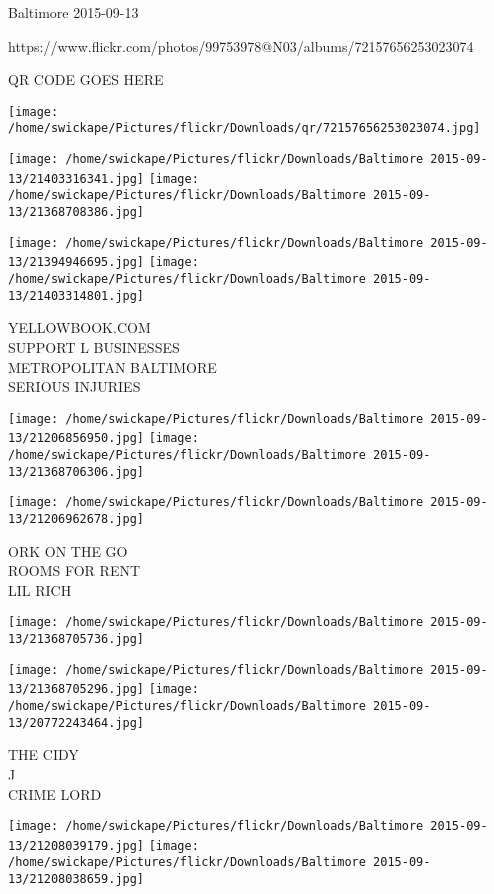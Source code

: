 \documentclass[10pt,letterpaper]{article}
\begin{document}
Baltimore 2015-09-13

https://www.flickr.com/photos/99753978@N03/albums/72157656253023074

QR CODE GOES HERE

\texttt{[image: /home/swickape/Pictures/flickr/Downloads/qr/72157656253023074.jpg]}
\pagebreak

\texttt{[image: /home/swickape/Pictures/flickr/Downloads/Baltimore 2015-09-13/21403316341.jpg]}
\texttt{[image: /home/swickape/Pictures/flickr/Downloads/Baltimore 2015-09-13/21368708386.jpg]}

\texttt{[image: /home/swickape/Pictures/flickr/Downloads/Baltimore 2015-09-13/21394946695.jpg]}
\texttt{[image: /home/swickape/Pictures/flickr/Downloads/Baltimore 2015-09-13/21403314801.jpg]}

YELLOWBOOK.COM\\
SUPPORT L BUSINESSES\\
METROPOLITAN BALTIMORE\\
SERIOUS INJURIES\\
\pagebreak

\texttt{[image: /home/swickape/Pictures/flickr/Downloads/Baltimore 2015-09-13/21206856950.jpg]}
\texttt{[image: /home/swickape/Pictures/flickr/Downloads/Baltimore 2015-09-13/21368706306.jpg]}

\vspace{0.25in}
\texttt{[image: /home/swickape/Pictures/flickr/Downloads/Baltimore 2015-09-13/21206962678.jpg]}

ORK ON THE GO\\
ROOMS FOR RENT\\
LIL RICH\\
\pagebreak

\texttt{[image: /home/swickape/Pictures/flickr/Downloads/Baltimore 2015-09-13/21368705736.jpg]}

\vspace{0.25in}
\texttt{[image: /home/swickape/Pictures/flickr/Downloads/Baltimore 2015-09-13/21368705296.jpg]}
\texttt{[image: /home/swickape/Pictures/flickr/Downloads/Baltimore 2015-09-13/20772243464.jpg]}

THE CIDY\\
J\\
CRIME LORD\\
\pagebreak

\texttt{[image: /home/swickape/Pictures/flickr/Downloads/Baltimore 2015-09-13/21208039179.jpg]}
\texttt{[image: /home/swickape/Pictures/flickr/Downloads/Baltimore 2015-09-13/21208038659.jpg]}
\end{document}
